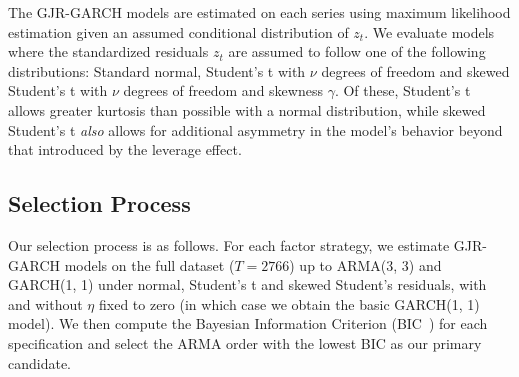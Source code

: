 The GJR-GARCH models are estimated on each series using maximum likelihood estimation given an assumed conditional distribution of $z_t$. We evaluate models where the standardized residuals $z_t$ are assumed to follow one of the following distributions: Standard normal, Student's t with $\nu$ degrees of freedom and skewed Student's t with $\nu$ degrees of freedom and skewness $\gamma$. Of these, Student's t allows greater kurtosis than possible with a normal distribution, while skewed Student's t \emph{also} allows for additional asymmetry in the model's behavior beyond that introduced by the leverage effect.


\subsection{Selection Process} %
\label{sub:selection_process}

Our selection process is as follows. For each factor strategy, we estimate GJR-GARCH models on the full dataset ($T = 2766$) up to ARMA(3, 3) and GARCH(1, 1) under normal, Student's t and skewed Student's residuals, with and without $\eta$ fixed to zero (in which case we obtain the basic GARCH(1, 1) model). We then compute the Bayesian Information Criterion (BIC~\autocite{Schwarz1978}) for each specification and select the ARMA order with the lowest BIC as our primary candidate.


